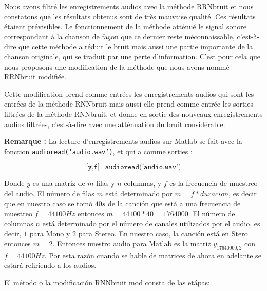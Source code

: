 \documentclass[conference,onecolumn]{IEEEtran}
\begin{document}
Nous avons filtré les enregistrements audios avec la méthode RRNbruit et nous constatons que les résultats obtenus sont de très mauvaise qualité. Ces résultats étaient prévisibles. Le fonctionnement de la méthode atténué le signal sonore correspondant à la chanson de façon que ce dernier reste méconnaissable, c’est-à-dire que cette méthode a réduit le bruit mais aussi une partie importante de la chanson originale, qui se traduit par une perte d’information. C’est pour cela que nous proposons une modification de la méthode que nous avons nommé RRNbruit modifiée.


Cette modification prend comme entrées les enregistrements audios qui sont les entrées de la méthode RNNbruit mais aussi elle prend comme entrée les sorties filtrées de la méthode RNNbruit, et donne en sortie des nouveaux enregistrements audios filtrées, c’est-à-dire avec une atténuation du bruit considérable. 

\item \textbf{Remarque :} La lecture d’enregistrements audios sur Matlab se fait avec la fonction \texttt{audioread('audio.wav')}, et qui a comme sorties :


\[ \texttt{[y,f]=audioread('audio.wav')}\]

Donde $y$ es una matriz de $m$ filas y $n$ columnas, y $f$ es la frecuencia de muestreo del audio. El número de filas $m$ está determinado por $m=f*duracion$, es decir que en nuestro caso se tomó $40s$ de la canción que está a una frecuencia de muestreo $f=44100Hz$ entonces $m=44100*40=1764000$. El número de columnas $n$ está determinado por el número de canales utilizados por el audio, es decir, $1$ para Mono y $2$ para Stereo. En nuestro caso, la canción está en Stero entonces $m=2$. Entonces nuestro audio para Matlab es la matriz $y_{17640000,2}$ con $f=44100Hz$. Por esta razón cuando se hable de matrices de ahora en adelante se estará refiriendo a los audios.

El método o la modificación RNNbruit mod consta de las etápas:
\end{document}
